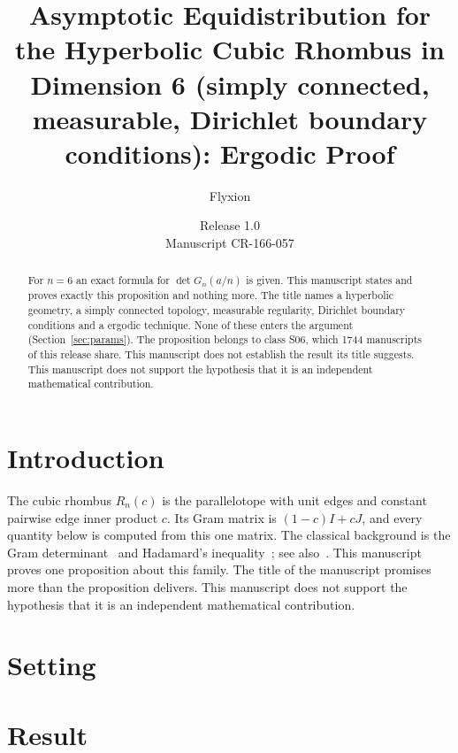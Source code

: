 \documentclass[11pt]{article}
\title{Asymptotic Equidistribution for the Hyperbolic Cubic Rhombus in Dimension 6 (simply connected, measurable, Dirichlet boundary conditions): Ergodic Proof}
\author{Flyxion}
\date{Release 1.0\\ Manuscript CR-166-057}
\begin{document}
\maketitle
\begin{abstract}
For $n=6$ an exact formula for $\det G_n(a/n)$ is given. This manuscript states and proves exactly this proposition and nothing more. The title names a hyperbolic geometry, a simply connected topology, measurable regularity, Dirichlet boundary conditions and a ergodic technique. None of these enters the argument (Section~\ref{sec:params}). The proposition belongs to class S06, which 1744 manuscripts of this release share. This manuscript does not establish the result its title suggests. This manuscript does not support the hypothesis that it is an independent mathematical contribution.
\end{abstract}

\section{Introduction}
The cubic rhombus $R_n(c)$ is the parallelotope with unit edges and constant pairwise edge inner product $c$. Its Gram matrix is $(1-c)I+cJ$, and every quantity below is computed from this one matrix. The classical background is the Gram determinant~\cite{gram} and Hadamard's inequality~\cite{hadamard}; see also~\cite{hj}.
This manuscript proves one proposition about this family. The title of the manuscript promises more than the proposition delivers. This manuscript does not support the hypothesis that it is an independent mathematical contribution.

\section{Setting}


\section{Result}

\end{document}
